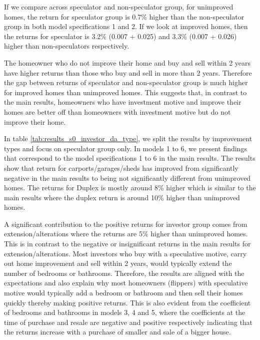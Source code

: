\documentclass[AEJ,reqno, draftmode]{AEA} %
\begin{document}

\restoregeometry


If we compare across speculator and non-speculator group, for unimproved homes, the return for speculator group is 0.7\% higher than the non-speculator group in both model specifications 1 and 2. If we look at improved homes, then the returns for speculator is 3.2\% (0.007 + 0.025) and 3.3\% (0.007 + 0.026) higher than non-speculators respectively.


The homeowner who do not improve their home and buy and sell within 2 years have higher returns than those who buy and sell in more than 2 years. Therefore the gap between returns of speculator and non-speculator group is much higher for improved homes than unimproved homes. This suggests that, in contrast to the main results, homeowners who have investment motive and improve their homes are better off than homeowners with investment motive but do not improve their home.

In table \ref{tab:results_s0_investor_da_type}, we split the results by improvement types and focus on speculator group only. In models 1 to 6, we present findings that correspond to the model specifications 1 to 6 in the main results. The results show that return for carports/garages/sheds has improved from significantly negative in the main results to being not significantly different from unimproved homes. The returns for Duplex is mostly around 8\% higher which is similar to the main results where the duplex return is around 10\% higher than unimproved homes. 


\restoregeometry

A significant contribution to the positive returns for investor group comes from extension/alterations where the returns are 5\% higher than unimproved homes. This is in contrast to the negative or insignificant returns in the main results for extension/alterations. Most investors who buy with a speculative motive, carry out home improvement and sell within 2 years, would typically extend the number of bedrooms or bathrooms. Therefore, the results are aligned with the expectations and also explain why most homeowners (flippers) with speculative motive would typically add a bedroom or bathroom and then sell their homes quickly thereby making positive returns. This is also evident from the coefficient of bedrooms and bathrooms in models 3, 4 and 5, where the coefficients at the time of purchase and resale are negative and positive respectively indicating that the returns increase with a purchase of smaller and sale of a bigger house.
\end{document}
